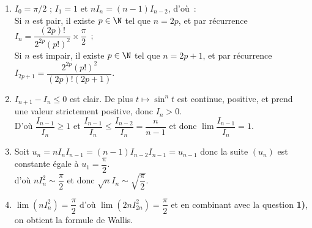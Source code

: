 
\begin{enumerate}
\item  $I_0=\pi/2$ ; $I_1=1$ et $nI_n=(n-1)I_{n-2}$, d'où~:\\
Si $n$ est pair, il existe $p\in\N$ tel que $n=2p$, et par récurrence $I_n=\dfrac{(2p)!}{2^{2p}(p!)^2}\times\dfrac{\pi}{2}$~;\\
Si $n$ est impair, il existe $p\in\N$ tel que $n=2p+1$, et par récurrence $I_{2p+1}=\dfrac{2^{2p}(p!)^2}{(2p)!(2p+1)}$.
\item $I_{n+1}-I_n\leqslant 0$ est clair. De plus $t\mapsto\sin^nt$ est continue, positive, et prend une valeur strictement positive, donc $I_n>0$.\\
D'où
$\dfrac{I_{n-1}}{I_n}\geqslant 1$ et $\dfrac{I_{n-1}}{I_n}\leqslant
\dfrac{I_{n-2}}{I_n}=\dfrac{n}{n-1}$ et donc
$\lim\dfrac{I_{n-1}}{I_n}=1$.
\item Soit $u_n=nI_nI_{n-1}=(n-1)I_{n-2}I_{n-1}=u_{n-1}$ donc la
suite $(u_n)$ est constante égale à $u_1=\dfrac{\pi}{2}$.
\\d'où $nI_n^2\sim \dfrac{\pi}{2}$ et donc
$\sqrt{n}I_n\sim\sqrt{\dfrac{\pi}{2}}$.
\item $\lim(nI_n^2)=\dfrac{\pi}{2}$ d'où
$\lim(2nI_{2n}^2)=\dfrac{\pi}{2}$ et en combinant avec la question
\textbf{1)}, on obtient la formule de Wallis.
\end{enumerate}

